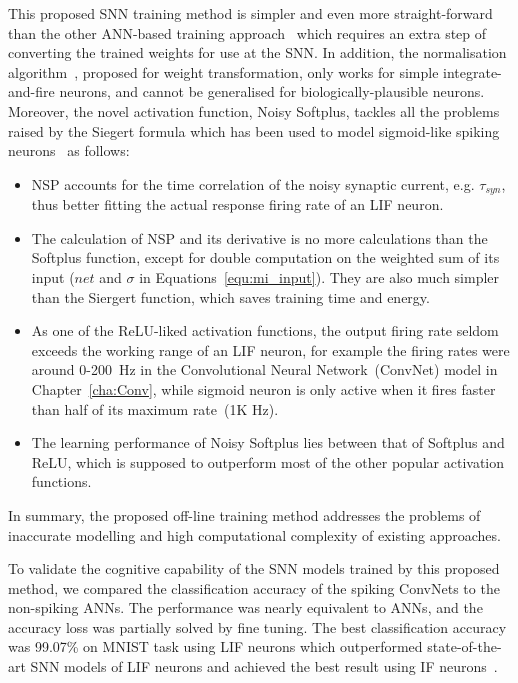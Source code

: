 This proposed SNN training method is simpler and even more straight-forward than the other ANN-based training approach~\citep{cao2015spiking,diehl2015fast} which requires an extra step of converting the trained weights for use at the SNN.
In addition, the normalisation algorithm~\citep{diehl2015fast}, proposed for weight transformation, only works for simple integrate-and-fire neurons, and cannot be generalised for biologically-plausible neurons.
Moreover, the novel activation function, Noisy Softplus, tackles all the problems raised by the Siegert formula which has been used to model sigmoid-like spiking neurons~\citep{Jug_etal_2012} as follows: 
\begin{itemize}
	\item NSP accounts for the time correlation of the noisy synaptic current, e.g. $\tau_{syn}$, thus better fitting the actual response firing rate of an LIF neuron. %
	
	
	\item The calculation of NSP and its derivative is no more calculations than the Softplus function, except for double computation on the weighted sum of its input ($net$ and $\sigma$ in Equations~\ref{equ:mi_input}).
	They are also much simpler than the Siergert function, which saves training time and energy.
	
	\item As one of the ReLU-liked activation functions, the output firing rate seldom exceeds the working range of an LIF neuron, for example the firing rates were around 0-200~Hz in the Convolutional Neural Network~(ConvNet) model in Chapter~\ref{cha:Conv}, while sigmoid neuron is only active when it fires faster than half of its maximum rate~(1K Hz).
	
	\item The learning performance of Noisy Softplus lies between that of Softplus and ReLU, which is supposed to outperform most of the other popular activation functions.
\end{itemize}
In summary, the proposed off-line training method addresses the problems of inaccurate modelling and high computational complexity of existing approaches.


To validate the cognitive capability of the SNN models trained by this proposed method, we compared the classification accuracy of the spiking ConvNets to the non-spiking ANNs.
The performance was nearly equivalent to ANNs, and the accuracy loss was partially solved by fine tuning.
The best classification accuracy was 99.07\% on MNIST task using LIF neurons which outperformed state-of-the-art SNN models of LIF neurons and achieved the best result using IF neurons~\citep{diehl2015fast}.


